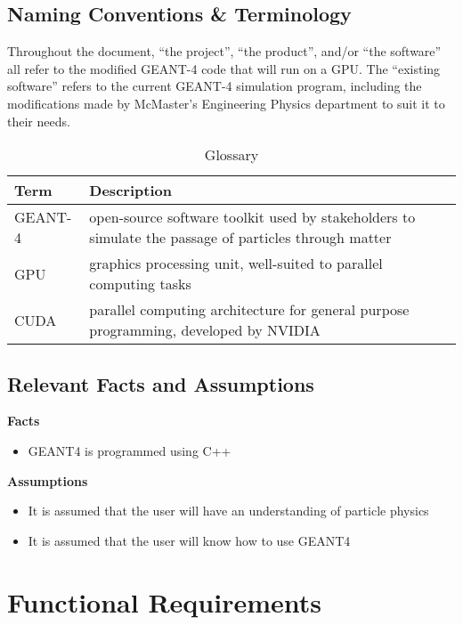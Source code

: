 \documentclass[12pt]{article}
\begin{document}
\subsection{Naming Conventions \& Terminology} %
Throughout the document, ``the project'', ``the product'', and/or ``the software'' all refer to the modified GEANT-4 code that will run on a GPU. The ``existing software'' refers to the current GEANT-4 simulation program, including the modifications made by McMaster's Engineering Physics department to suit it to their needs.\\

\begin{table}[h]
\centering
\begin{tabularx}{\textwidth}{|l|X|}
\hline
Term & Description\\
\hline
GEANT-4 & open-source software toolkit used by stakeholders to simulate the passage of particles through matter\\
GPU & graphics processing unit, well-suited to parallel computing tasks\\
CUDA & parallel computing architecture for general purpose programming, developed by NVIDIA\\
\hline
\end{tabularx}
\caption{Glossary}
\end{table}

\subsection{Relevant Facts and Assumptions} %
\textbf{Facts}
\begin{itemize}
	\item GEANT4 is programmed using C++
\end{itemize}
\textbf{Assumptions}
 \begin{itemize}
	\item It is assumed that the user will have an understanding of particle physics
	\item It is assumed that the user will know how to use GEANT4
\end{itemize}

\section{Functional Requirements}
\end{document}

